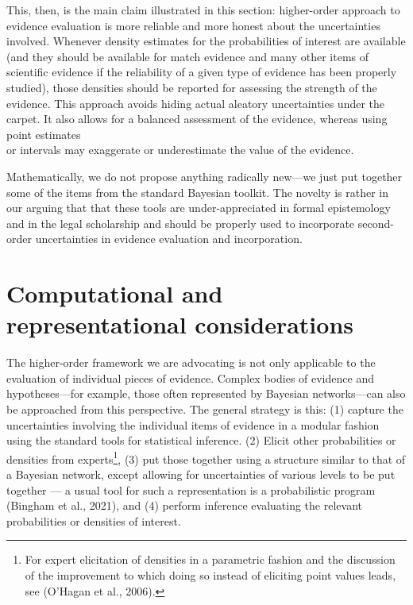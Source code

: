 \documentclass[
  letterpaper,
  DIV=11,
  numbers=noendperiod]{scrartcl}
\begin{document}
This, then, is the main claim illustrated in this section: higher-order
approach to evidence evaluation is more reliable and more honest about
the uncertainties involved. Whenever density estimates for the
probabilities of interest are available (and they should be available
for match evidence and many other items of scientific evidence if the
reliability of a given type of evidence has been properly studied),
those densities should be reported for assessing the strength of the
evidence. This approach avoids hiding actual aleatory uncertainties
under the carpet. It also allows for a balanced assessment of the
evidence, whereas using point estimates\\
or intervals may exaggerate or underestimate the value of the evidence.

Mathematically, we do not propose anything radically new---we just put
together some of the items from the standard Bayesian toolkit. The
novelty is rather in our arguing that that these tools are
under-appreciated in formal epistemology and in the legal scholarship
and should be properly used to incorporate second-order uncertainties in
evidence evaluation and incorporation.

\hypertarget{computational-and-representational-considerations}{%
\section{Computational and representational
considerations}\label{computational-and-representational-considerations}}

The higher-order framework we are advocating is not only applicable to
the evaluation of individual pieces of evidence. Complex bodies of
evidence and hypotheses---for example, those often represented by
Bayesian networks---can also be approached from this perspective. The
general strategy is this: (1) capture the uncertainties involving the
individual items of evidence in a modular fashion using the standard
tools for statistical inference. (2) Elicit other probabilities or
densities from experts\footnote{For expert elicitation of densities in a
  parametric fashion and the discussion of the improvement to which
  doing so instead of eliciting point values leads, see (O'Hagan et al.,
  2006).}, (3) put those together using a structure similar to that of a
Bayesian network, except allowing for uncertainties of various levels to
be put together --- a usual tool for such a representation is a
probabilistic program (Bingham et al., 2021), and (4) perform inference
evaluating the relevant probabilities or densities of interest.
\end{document}
